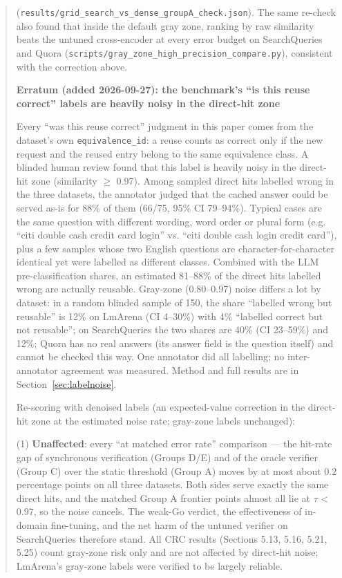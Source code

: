 \documentclass[11pt]{article}
\begin{document}
\begin{quote}
(\texttt{results/\allowbreak{}grid\_\allowbreak{}search\_\allowbreak{}vs\_\allowbreak{}dense\_\allowbreak{}group\allowbreak{}A\_\allowbreak{}check.\allowbreak{}json}). The same re-check also found that inside the default gray zone, ranking by raw similarity beats the untuned cross-encoder at every error budget on SearchQueries and Quora (\texttt{scripts/\allowbreak{}gray\_\allowbreak{}zone\_\allowbreak{}high\_\allowbreak{}precision\_\allowbreak{}compare.\allowbreak{}py}), consistent with the correction above.


\noindent\textbf{Erratum (added 2026-09-27): the benchmark's ``is this reuse correct'' labels are heavily noisy in the direct-hit zone}

\noindent Every ``was this reuse correct'' judgment in this paper comes from the dataset's own \texttt{equivalence\_\allowbreak{}id}: a reuse counts as correct only if the new request and the reused entry belong to the same equivalence class. A blinded human review found that this label is heavily noisy in the direct-hit zone (similarity $\geq$ 0.97). Among sampled direct hits labelled wrong in the three datasets, the annotator judged that the cached answer could be served as-is for 88\% of them (66/75, 95\% CI 79–94\%). Typical cases are the same question with different wording, word order or plural form (e.g. ``citi double cash credit card login'' vs. ``citi double cash login credit card''), plus a few samples whose two English questions are character-for-character identical yet were labelled as different classes. Combined with the LLM pre-classification shares, an estimated 81–88\% of the direct hits labelled wrong are actually reusable. Gray-zone (0.80–0.97) noise differs a lot by dataset: in a random blinded sample of 150, the share ``labelled wrong but reusable'' is 12\% on LmArena (CI 4–30\%) with 4\% ``labelled correct but not reusable''; on SearchQueries the two shares are 40\% (CI 23–59\%) and 12\%; Quora has no real answers (its answer field is the question itself) and cannot be checked this way. One annotator did all labelling; no inter-annotator agreement was measured. Method and full results are in Section~\ref{sec:labelnoise}.

\noindent Re-scoring with denoised labels (an expected-value correction in the direct-hit zone at the estimated noise rate; gray-zone labels unchanged):

\noindent (1) \textbf{Unaffected}: every ``at matched error rate'' comparison — the hit-rate gap of synchronous verification (Groups D/E) and of the oracle verifier (Group C) over the static threshold (Group A) moves by at most about 0.2 percentage points on all three datasets. Both sides serve exactly the same direct hits, and the matched Group A frontier points almost all lie at $\tau$ < 0.97, so the noise cancels. The weak-Go verdict, the effectiveness of in-domain fine-tuning, and the net harm of the untuned verifier on SearchQueries therefore stand. All CRC results (Sections 5.13, 5.16, 5.21, 5.25) count gray-zone risk only and are not affected by direct-hit noise; LmArena's gray-zone labels were verified to be largely reliable.


\end{quote}
\end{document}
